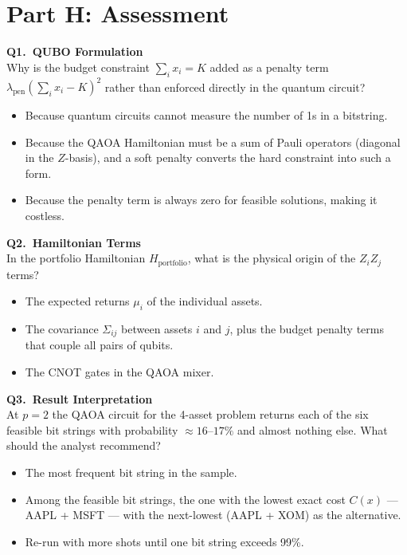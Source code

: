 \documentclass[a4paper,11pt]{article}
\begin{document}
\section{Part H: Assessment}

\textbf{Q1.\ QUBO Formulation}\\
Why is the budget constraint $\sum_i x_i = K$ added as a penalty term
$\lambda_\text{pen}(\sum_i x_i - K)^2$ rather than enforced directly in
the quantum circuit?
\begin{itemize}
    \item[A)] Because quantum circuits cannot measure the number of 1s
              in a bitstring.
    \item[B)] Because the QAOA Hamiltonian must be a sum of Pauli operators
              (diagonal in the $Z$-basis), and a soft penalty converts the
              hard constraint into such a form.
    \item[C)] Because the penalty term is always zero for feasible solutions,
              making it costless.
\end{itemize}

\vspace{0.3cm}
\textbf{Q2.\ Hamiltonian Terms}\\
In the portfolio Hamiltonian $H_\text{portfolio}$, what is the physical
origin of the $Z_iZ_j$ terms?
\begin{itemize}
    \item[A)] The expected returns $\mu_i$ of the individual assets.
    \item[B)] The covariance $\Sigma_{ij}$ between assets $i$ and $j$,
              plus the budget penalty terms that couple all pairs of qubits.
    \item[C)] The CNOT gates in the QAOA mixer.
\end{itemize}

\vspace{0.3cm}
\textbf{Q3.\ Result Interpretation}\\
At $p = 2$ the QAOA circuit for the 4-asset problem returns each of the
six feasible bit strings with probability $\approx 16$--$17\%$ and almost
nothing else. What should the analyst recommend?
\begin{itemize}
    \item[A)] The most frequent bit string in the sample.
    \item[B)] Among the feasible bit strings, the one with the lowest exact
              cost $C(x)$ --- AAPL + MSFT --- with the next-lowest
              (AAPL + XOM) as the alternative.
    \item[C)] Re-run with more shots until one bit string exceeds 99\%.
\end{itemize}
\end{document}
